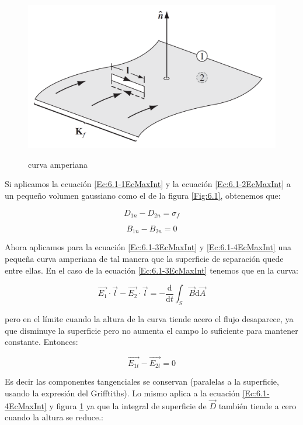 \documentclass[12pt,a4paper]{article}
\newcommand{\D}{\mathrm{d}}
\begin{document}
\begin{figure}[h!] \centering
\includegraphics[scale=0.3]{condicionesmaxwell2.png}
\label{Fig:6.2}
\caption{curva amperiana}
\end{figure}

Si aplicamos la ecuación \ref{Ec:6.1-1EcMaxInt} y la ecuación \ref{Ec:6.1-2EcMaxInt} a un pequeño volumen gaussiano como el de la figura \ref{Fig:6.1}, obtenemos que:

\begin{equation}
D_{1n} - D_{2n} = \sigma_f
\end{equation}

\begin{equation}
B_{1n} - B_{2n} = 0
\end{equation}

Ahora aplicamos para la ecuación \ref{Ec:6.1-3EcMaxInt} y \ref{Ec:6.1-4EcMaxInt} una pequeña curva amperiana de tal manera que la superficie de separación quede entre ellas. En el caso de la ecuación \ref{Ec:6.1-3EcMaxInt} tenemos que en la curva:

$$ \vec{E_1} \cdot \vec{l} - \vec{E_2} \cdot \vec{l} = - \dfrac{\D}{\D t} \int_S \vec{B} \D \vec{A} $$

pero en el límite cuando la altura de la curva tiende acero el flujo desaparece, ya que disminuye la superficie pero no aumenta el campo lo suficiente para mantener constante. Entonces:

\begin{equation}
\vec{E_{1t}} - \vec{E_{2t}} = 0
\end{equation}

Es decir las componentes tangenciales se conservan (paralelas a la superficie, usando la expresión del Grifftiths). Lo mismo aplica a la ecuación \ref{Ec:6.1-4EcMaxInt} y figura \ref{Fig:6.2} ya que la integral de superficie de $\vec{D}$ también tiende a cero cuando la altura se reduce.:
\end{document}
